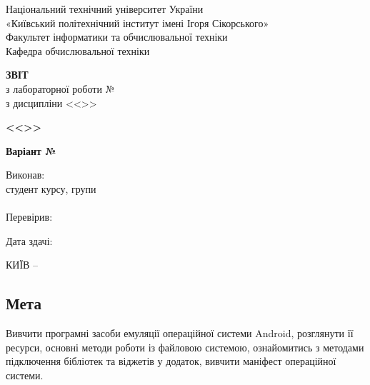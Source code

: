 \documentclass[14pt, a4paper]{extreport}
\begin{document}
	
	\begin{titlepage}
		\begin{center}
			\normalsize
			Національний технічний університет України\\
			«Київський політехнічний інститут імені Ігоря Сікорського» \\[0.5em]
			Факультет інформатики та обчислювальної техніки\\
			Кафедра обчислювальної техніки
			
			\vfill
			
			{\large \textbf{ЗВІТ}\\[0.5em]}
			{з лабораторної роботи №\LabNumber \\}
			{з дисципліни <<\CourseTitle>>}
			
			\vspace{2em}
			
			{\textbf{<<\Topic>>}}
			
			\vspace{1em}
			
			{\textbf{Варіант №\Variant}}
			
			\vfill
			
			\begin{flushright}
				Виконав: \\ студент \CourseNumber{} курсу, групи \StudentGroup \\
				\StudentName \\[1em]
				Перевірив: \\ \Teacher
			\end{flushright}
			
			\vfill
			
			\begin{flushright}
				Дата здачі: \DTMtoday
			\end{flushright}
			
			\vspace{5em}
			КИЇВ -- \ReportYear
		\end{center}
	\end{titlepage}
	
	\clearpage
	\setcounter{page}{2}
	
	\subsection*{Мета} 
	
	Вивчити програмні засоби емуляції операційної системи Android, розглянути її ресурси, основні методи роботи із файловою системою, ознайомитись з методами підключення бібліотек та віджетів у додаток, вивчити маніфест операційної системи.
	
\end{document}
